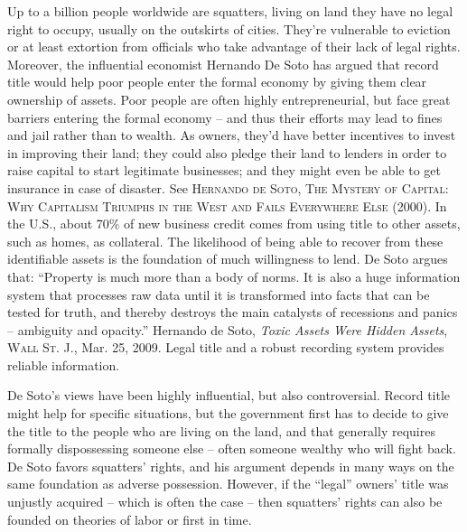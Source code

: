
Up to a billion people worldwide are squatters, living on land they have no
legal right to occupy, usually on the outskirts of cities. They're vulnerable
to eviction or at least extortion from officials who take advantage of their
lack of legal rights. Moreover, the influential economist Hernando De Soto has
argued that record title would help poor people enter the formal economy by
giving them clear ownership of assets. Poor people are often highly
entrepreneurial, but face great barriers entering the formal economy -- and
thus their efforts may lead to fines and jail rather than to wealth. As owners,
they'd have better incentives to invest in improving their land; they could
also pledge their land to lenders in order to raise capital to start legitimate
businesses; and they might even be able to get insurance in case of disaster.
See \textsc{Hernando de Soto, The Mystery of Capital: Why Capitalism Triumphs
in the West and Fails Everywhere Else} (2000). In the U.S., about 70\% of new
business credit comes from using title to other assets, such as homes, as
collateral. The likelihood of being able to recover from these identifiable
assets is the foundation of much willingness to lend. De Soto argues that:
``Property is much more than a body of norms. It is also a huge information
system that processes raw data until it is transformed into facts that can be
tested for truth, and thereby destroys the main catalysts of recessions and
panics -- ambiguity and opacity.'' Hernando de Soto, \textit{Toxic Assets Were
Hidden Assets}, \textsc{Wall St. J.}, Mar. 25, 2009. Legal title and a robust
recording system provides reliable information.

De Soto's views have been highly influential, but also controversial. Record
title might help for specific situations, but the government first has to
decide to give the title to the people who are living on the land, and that
generally requires formally dispossessing someone else -- often someone wealthy
who will fight back. De Soto favors squatters' rights, and his argument depends
in many ways on the same foundation as adverse possession. However, if the
``legal'' owners' title was unjustly acquired -- which is often the case --
then squatters' rights can also be founded on theories of labor or first in
time.

